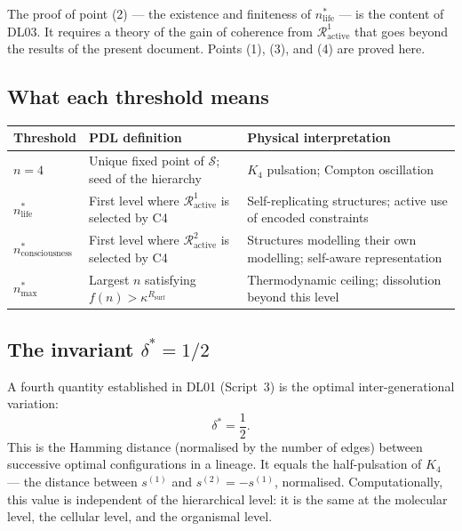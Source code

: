 \documentclass[12pt,a4paper]{article}
\theoremstyle{plain}
\theoremstyle{definition}
\theoremstyle{remark}
\newcommand{\Kfour}{K_4}
\newcommand{\Sop}{\mathcal{S}}
\newcommand{\Rop}{\mathcal{R}}
\newcommand{\kap}{\kappa}
\newcommand{\nlife}{n^{*}_{\mathrm{life}}}
\newcommand{\ncons}{n^{*}_{\mathrm{consciousness}}}
\newcommand{\nmax}{n^{*}_{\mathrm{max}}}
\newcommand{\deltastar}{\delta^{*}}
\begin{document}
The proof of point (2) --- the existence and finiteness of $\nlife$ --- is the content
of DL03. It requires a theory of the gain of coherence from $\Rop^1_{\mathrm{active}}$
that goes beyond the results of the present document. Points (1), (3), and (4) are
proved here.

\subsection{What each threshold means}

\begin{center}
\begin{tabular}{p{3cm}p{5.5cm}p{5cm}}
\toprule
\textbf{Threshold} & \textbf{PDL definition} & \textbf{Physical interpretation} \\
\midrule
$n = 4$ & Unique fixed point of $\Sop$; seed of the hierarchy & $\Kfour$ pulsation; Compton oscillation \\
$\nlife$ & First level where $\Rop^1_{\mathrm{active}}$ is selected by C4 & Self-replicating structures; active use of encoded constraints \\
$\ncons$ & First level where $\Rop^2_{\mathrm{active}}$ is selected by C4 & Structures modelling their own modelling; self-aware representation \\
$\nmax$ & Largest $n$ satisfying $f(n) > \kap^{R_{\mathrm{surf}}}$ & Thermodynamic ceiling; dissolution beyond this level \\
\bottomrule
\end{tabular}
\end{center}

\subsection{The invariant \texorpdfstring{$\deltastar = 1/2$}{δ* = 1/2}}

A fourth quantity established in DL01 (Script~3) is the optimal inter-generational
variation:
\begin{equation}
\deltastar = \frac{1}{2}.
\end{equation}
This is the Hamming distance (normalised by the number of edges) between successive
optimal configurations in a lineage. It equals the half-pulsation of $\Kfour$ ---
the distance between $s^{(1)}$ and $s^{(2)} = -s^{(1)}$, normalised. Computationally,
this value is independent of the hierarchical level: it is the same at the molecular
level, the cellular level, and the organismal level.
\end{document}

